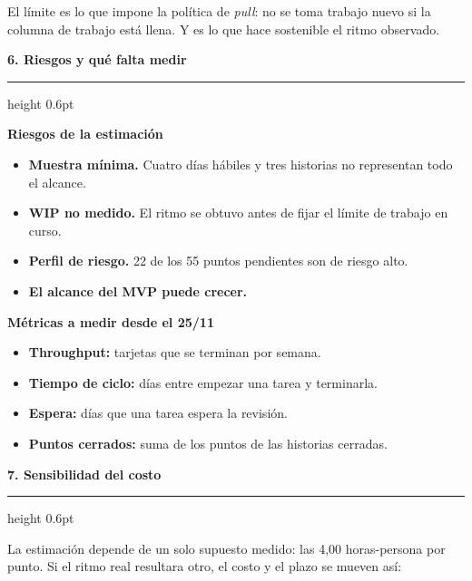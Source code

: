 \documentclass[10pt,letterpaper]{article}
\newcommand{\seccion}[1]{%
  \par\vspace{7pt}%
  {\color{azul}\bfseries\large #1}\par
  \vspace{1pt}%
  {\color{linea}\hrule height 0.6pt}\vspace{4pt}%
}
\begin{document}
\vspace{3pt}
{\small\color{gris} El límite es lo que impone la política de \emph{pull}: no se
toma trabajo nuevo si la columna de trabajo está llena. Y es lo que hace
sostenible el ritmo observado.}

\seccion{6. Riesgos y qué falta medir}

\begin{minipage}[t]{0.49\textwidth}
{\small\textbf{Riesgos de la estimación}\par}
\vspace{2pt}
{\small
\begin{itemize}
\item \textbf{Muestra mínima.} Cuatro días hábiles y tres historias no
  representan todo el alcance.
\item \textbf{WIP no medido.} El ritmo se obtuvo antes de fijar el límite
  de trabajo en curso.
\item \textbf{Perfil de riesgo.} 22 de los 55 puntos pendientes son de
  riesgo alto.
\item \textbf{El alcance del MVP puede crecer.}
\end{itemize}}
\end{minipage}\hfill
\begin{minipage}[t]{0.49\textwidth}
{\small\textbf{Métricas a medir desde el 25/11}\par}
\vspace{2pt}
{\small
\begin{itemize}
\item \textbf{Throughput:} tarjetas que se terminan por semana.
\item \textbf{Tiempo de ciclo:} días entre empezar una tarea y terminarla.
\item \textbf{Espera:} días que una tarea espera la revisión.
\item \textbf{Puntos cerrados:} suma de los puntos de las historias
  cerradas.
\end{itemize}}
\end{minipage}

\seccion{7. Sensibilidad del costo}

La estimación depende de un solo supuesto medido: las 4,00 horas-persona por
punto. Si el ritmo real resultara otro, el costo y el plazo se mueven así:
\end{document}

